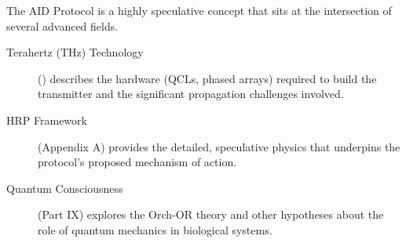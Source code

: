 \begin{importantbox}[title={Further Reading}]
    The AID Protocol is a highly speculative concept that sits at the intersection of several advanced fields.
    \begin{description}
        \item[Terahertz (THz) Technology] () describes the hardware (QCLs, phased arrays) required to build the transmitter and the significant propagation challenges involved.
        \item[HRP Framework] (Appendix A) provides the detailed, speculative physics that underpins the protocol's proposed mechanism of action.
        \item[Quantum Consciousness] (Part IX) explores the Orch-OR theory and other hypotheses about the role of quantum mechanics in biological systems.
    \end{description}
\end{importantbox}